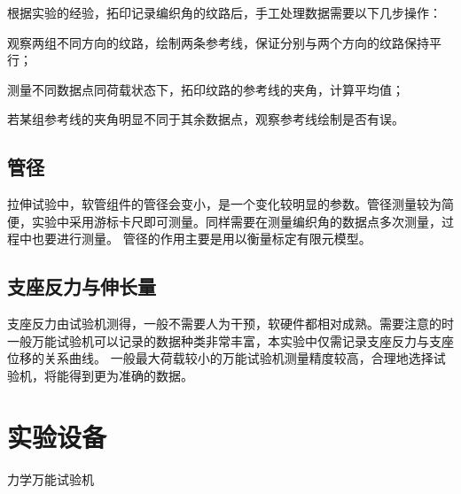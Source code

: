 
根据实验的经验，拓印记录编织角的纹路后，手工处理数据需要以下几步操作：
\begin{compactenum}
\item 观察两组不同方向的纹路，绘制两条参考线，保证分别与两个方向的纹路保持平行；
\item 测量不同数据点同荷载状态下，拓印纹路的参考线的夹角，计算平均值；
\item 若某组参考线的夹角明显不同于其余数据点，观察参考线绘制是否有误。
\end{compactenum}





\subsection{管径}
拉伸试验中，软管组件的管径会变小，是一个变化较明显的参数。管径测量较为简便，实验中采用游标卡尺即可测量。同样需要在测量编织角的数据点多次测量，过程中也要进行测量。
管径的作用主要是用以衡量标定有限元模型。
\subsection{支座反力与伸长量}
支座反力由试验机测得，一般不需要人为干预，软硬件都相对成熟。需要注意的时一般万能试验机可以记录的数据种类非常丰富，本实验中仅需记录支座反力与支座位移的关系曲线。
一般最大荷载较小的万能试验机测量精度较高，合理地选择试验机，将能得到更为准确的数据。







\section{实验设备}

力学万能试验机


